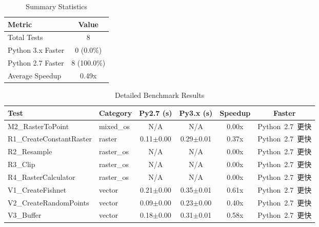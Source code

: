 
\begin{table}[htbp]
\centering
\caption{Summary Statistics}
\begin{tabular}{lc}
\hline
\textbf{Metric} & \textbf{Value} \\
\hline
Total Tests & 8 \\
Python 3.x Faster & 0 (0.0\%) \\
Python 2.7 Faster & 8 (100.0\%) \\
Average Speedup & 0.49x \\
\hline
\end{tabular}
\label{tab:summary_stats}
\end{table}

\begin{table}[htbp]
\centering
\caption{Detailed Benchmark Results}
\begin{tabular}{llcccc}
\hline
\textbf{Test} & \textbf{Category} & \textbf{Py2.7 (s)} & \textbf{Py3.x (s)} & \textbf{Speedup} & \textbf{Faster} \\
\hline
M2\_RasterToPoint & mixed_os & N/A & N/A & 0.00x & Python\ 2.7\ 更快 \\
R1\_CreateConstantRaster & raster & 0.11$\pm$0.00 & 0.29$\pm$0.01 & 0.37x & Python\ 2.7\ 更快 \\
R2\_Resample & raster_os & N/A & N/A & 0.00x & Python\ 2.7\ 更快 \\
R3\_Clip & raster_os & N/A & N/A & 0.00x & Python\ 2.7\ 更快 \\
R4\_RasterCalculator & raster_os & N/A & N/A & 0.00x & Python\ 2.7\ 更快 \\
V1\_CreateFishnet & vector & 0.21$\pm$0.00 & 0.35$\pm$0.01 & 0.61x & Python\ 2.7\ 更快 \\
V2\_CreateRandomPoints & vector & 0.09$\pm$0.00 & 0.23$\pm$0.00 & 0.40x & Python\ 2.7\ 更快 \\
V3\_Buffer & vector & 0.18$\pm$0.00 & 0.31$\pm$0.01 & 0.58x & Python\ 2.7\ 更快 \\
\hline
\end{tabular}
\label{tab:detailed_results}
\end{table}